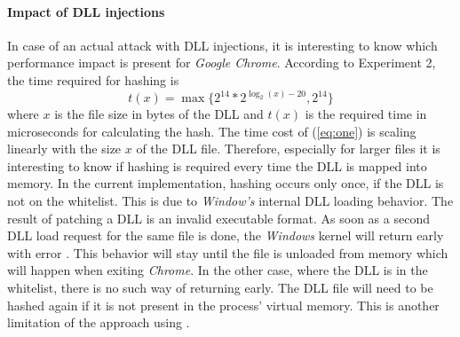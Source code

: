 \paragraph{Impact of \gls{DLL} injections}
In case of an actual attack with \gls{DLL} injections, it is interesting to know which performance impact is present for \emph{Google Chrome}. According to Experiment 2, the time required for hashing is
\begin{equation}
t(x) = \max\{2^{14} * 2^{\log_2(x) - 20}, 2^{14}\} \label{eq:one}
\end{equation}
where $x$ is the file size in bytes of the \gls{DLL} and $t(x)$ is the required time in microseconds for calculating the hash. The time cost of (\ref{eq:one}) is scaling linearly with the size $x$ of the \gls{DLL} file. Therefore, especially for larger files it is interesting to know if hashing is required every time the \gls{DLL} is mapped into memory. In the current implementation, hashing occurs only once, if the \gls{DLL} is not on the whitelist. This is due to \emph{Window's} internal \gls{DLL} loading behavior. The result of patching a \gls{DLL} is an invalid executable format. As soon as a second \gls{DLL} load request for the same file is done, the \emph{Windows} kernel will return early with error . This behavior will stay until the file is unloaded from memory which will happen when exiting \emph{Chrome}. In the other case, where the \gls{DLL} is in the whitelist, there is no such way of returning early. The \gls{DLL} file will need to be hashed again if it is not present in the process' virtual memory. This is another limitation of the approach using .